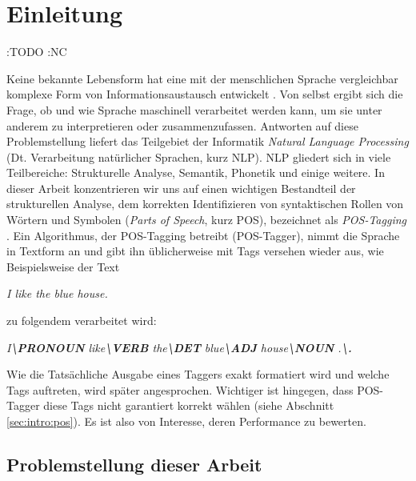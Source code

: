 %
\chapter{Einleitung}
\label{sec:intro}


:TODO :NC

Keine bekannte Lebensform hat eine mit der menschlichen Sprache vergleichbar komplexe Form von Informationsaustausch entwickelt \cite{Rao:2018}. Von selbst ergibt sich die Frage, ob und wie Sprache maschinell verarbeitet werden kann, um sie unter anderem zu interpretieren oder zusammenzufassen. Antworten auf diese Problemstellung liefert das Teilgebiet der Informatik \textit{Natural Language Processing} (Dt. Verarbeitung natürlicher Sprachen, kurz NLP). NLP gliedert sich in viele Teilbereiche: Strukturelle Analyse, Semantik, Phonetik und einige weitere. In dieser Arbeit konzentrieren wir uns auf einen wichtigen Bestandteil der strukturellen Analyse, dem korrekten Identifizieren von syntaktischen Rollen von Wörtern und Symbolen (\textit{Parts of Speech}, kurz POS), bezeichnet als \textit{POS-Tagging} \cite{Smith:2011}.
\newline
Ein Algorithmus, der POS-Tagging betreibt (POS-Tagger), nimmt die Sprache in Textform an und gibt ihn üblicherweise mit Tags versehen wieder aus, wie Beispielsweise der Text
\newline \newline
\centerline{\textit{I like the blue house.}}
	
 zu folgendem verarbeitet wird:
\newline \newline
\centerline{\textit{I\textbf{\textbackslash PRONOUN} like\textbf{\textbackslash VERB} the\textbf{\textbackslash DET} blue\textbf{\textbackslash ADJ} house\textbf{\textbackslash NOUN} .\textbf{\textbackslash .}}}

Wie die Tatsächliche Ausgabe eines Taggers exakt formatiert wird und welche Tags auftreten, wird später angesprochen. Wichtiger ist hingegen, dass POS-Tagger diese Tags nicht garantiert korrekt wählen (siehe Abschnitt \ref{sec:intro:pos}). Es ist also von Interesse, deren Performance zu bewerten.


\section{Problemstellung dieser Arbeit}
\label{sec:intro:task}

